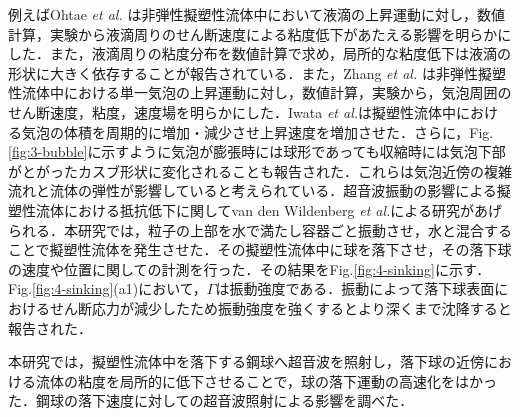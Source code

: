 例えばOhtae {\it et al.} \cite{ref:2}は非弾性擬塑性流体中において液滴の上昇運動に対し，数値計算，実験から液滴周りのせん断速度による粘度低下があたえる影響を明らかにした．また，液滴周りの粘度分布を数値計算で求め，局所的な粘度低下は液滴の形状に大きく依存することが報告されている\cite{ref:3}．また，Zhang {\it et al.} \cite{ref:4}は非弾性擬塑性流体中における単一気泡の上昇運動に対し，数値計算，実験から，気泡周囲のせん断速度，粘度，速度場を明らかにした．Iwata {\it et al.}\cite{ref:5}は擬塑性流体中における気泡の体積を周期的に増加・減少させ上昇速度を増加させた．さらに，Fig.\ref{fig:3-bubble}に示すように気泡が膨張時には球形であっても収縮時には気泡下部がとがったカスブ形状に変化されることも報告された．これらは気泡近傍の複雑流れと流体の弾性が影響していると考えられている．超音波振動の影響による擬塑性流体における抵抗低下に関してvan den Wildenberg {\it et al.}\cite{ref:6}による研究があげられる．本研究では，粒子の上部を水で満たし容器ごと振動させ，水と混合することで擬塑性流体を発生させた．その擬塑性流体中に球を落下させ，その落下球の速度や位置に関しての計測を行った．その結果をFig.\ref{fig:4-sinking}に示す．Fig.\ref{fig:4-sinking}(a1)において，$\Gamma$は振動強度である．振動によって落下球表面におけるせん断応力が減少したため振動強度を強くするとより深くまで沈降すると報告された．

本研究では，擬塑性流体中を落下する鋼球へ超音波を照射し，落下球の近傍における流体の粘度を局所的に低下させることで，球の落下運動の高速化をはかった．鋼球の落下速度に対しての超音波照射による影響を調べた．

